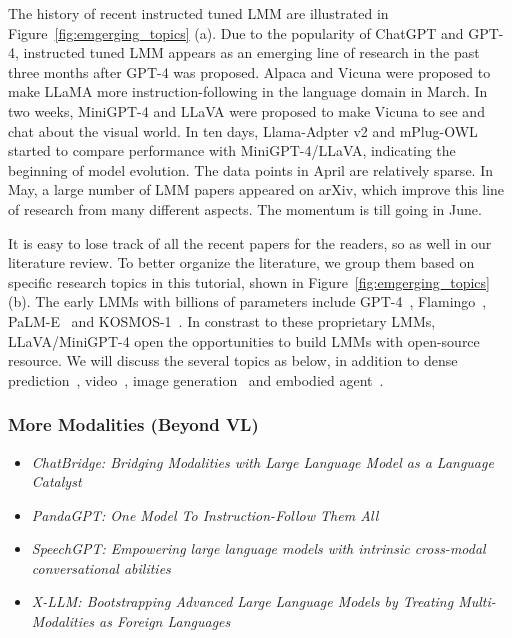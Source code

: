 \documentclass{article}
\begin{document}
The history of recent instructed tuned LMM are illustrated in Figure~\ref{fig:emgerging_topics} (a). 
Due to the popularity of ChatGPT and GPT-4,  instructed tuned LMM appears as an emerging line of research in the past three months after GPT-4 was proposed. Alpaca and Vicuna were proposed to make LLaMA more instruction-following in the language domain in March.
In two weeks, MiniGPT-4 and LLaVA were proposed to make Vicuna to see and chat about the visual world. In ten days, Llama-Adpter v2 and mPlug-OWL started to compare performance with MiniGPT-4/LLaVA, indicating the beginning of model evolution. The data points in April are relatively sparse.
%
In May, a large number of LMM papers appeared on arXiv, which improve this line of research from many different aspects. The momentum is till going in June.

It is easy to lose track of all the recent papers for the readers, so as well in our literature review. To better organize the literature, we group them based on specific research topics in this tutorial, shown in Figure~\ref{fig:emgerging_topics} (b). The early LMMs with billions of parameters include GPT-4~\citep{gpt4}, Flamingo~\citep{alayrac2022flamingo}, 
PaLM-E~\cite{driess2023palm} and KOSMOS-1~\citep{huang2023language}. In constrast to these proprietary LMMs, LLaVA/MiniGPT-4 open the opportunities to build LMMs with open-source resource.
%
We will discuss the several topics as below, in addition to dense prediction~\citep{wang2023visionllm,zang2023contextual}, video~\citep{zhang2023video,luo2023valley,li2023videochat}, image generation~\citep{koh2023generating} and embodied agent~\citep{mu2023embodiedgpt}. 



\subsubsection{More Modalities (Beyond VL)}
%
\begin{itemize}[leftmargin=7.5mm]
\setlength{\itemsep}{2pt}
\footnotesize
\item 
{\it ChatBridge: Bridging Modalities with Large Language Model as a Language Catalyst~\citep{zhao2023chatbridge}}

\item
{\it PandaGPT: One Model To Instruction-Follow Them All~\citep{su2023pandagpt}}

\item
{\it SpeechGPT: Empowering large language models with intrinsic cross-modal conversational abilities~\citep{zhang2023speechgpt}}

\item
{\it X-LLM: Bootstrapping Advanced Large Language Models by Treating Multi-Modalities as Foreign Languages~\citep{chen2023x}}
\end{itemize}
\end{document}
